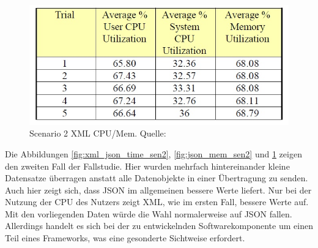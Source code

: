 \documentclass[a4paper]{article}
\begin{document}
	\begin{figure}[H] 
		\includegraphics[width=\linewidth]{../Bilder/xml_mem_sen2.jpg}
		\caption{Scenario 2 XML CPU/Mem. Quelle: \cite{XmlJson}}
		\label{fig:xml_mem_sen2}
	\end{figure}
	
	Die Abbildungen \ref{fig:xml_json_time_sen2}, \ref{fig:json_mem_sen2}
	und \ref{fig:xml_mem_sen2} zeigen den zweiten Fall der Fallstudie. Hier
	wurden mehrfach hintereinander kleine Datensatze überragen anstatt alle
	Datenobjekte in einer Übertragung zu senden. Auch hier zeigt sich, dass
	JSON im allgemeinen bessere Werte liefert. Nur bei der Nutzung der CPU des
	Nutzers zeigt XML, wie im ersten Fall, bessere Werte auf. \\
	 
	Mit den vorliegenden Daten würde die Wahl normalerweise auf JSON fallen.
	Allerdings handelt es sich bei der zu entwickelnden Softwarekomponente um
	einen Teil eines Frameworks, was eine gesonderte Sichtweise erfordert. 
	
\end{document}
